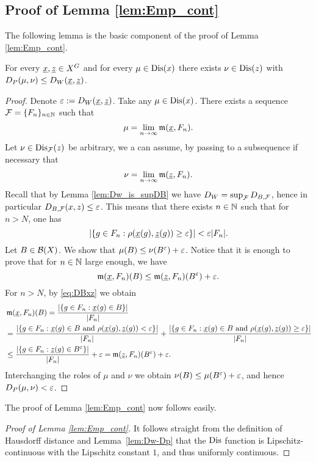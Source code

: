 \subsection*{Proof of Lemma \ref{lem:Emp_cont}} 

The following lemma is the basic component of the proof of Lemma \ref{lem:Emp_cont}.

\begin{lem}\label{lem:Dw-Dp}
For every $\underline{x},\underline{z}\in X^G$ and for every $\mu \in \operatorname{Dis}(x)$ there exists $\nu \in \operatorname{Dis}(z)$ with $D_P(\mu,\nu)\leq D_W(\underline{x},\underline{z})$.
\end{lem}
\begin{proof}
Denote $\varepsilon:=D_W(\underline{x}, \underline{z})$.
%
Take any $\mu \in \operatorname{Dis}(x)$. There exists a \Folner sequence $\operatorname{\mathcal{F}} = \{F_n\}_{n \in \mathbb{N}}$ such that
\[\mu=\lim_{n\to\infty}\operatorname{\mathfrak m}(\underline{x},F_{n}).\]
Let $\nu \in \operatorname{Dis}_{\operatorname{\mathcal{F}}}(z)$ be arbitrary, we a can assume, by passing to a subsequence if necessary that
\[\nu=\lim_{n\to\infty}\operatorname{\mathfrak m}(\underline{z},F_{n}).\]
Recall that by Lemma \ref{lem:Dw_is_supDB} we have $D_W=\sup_{\operatorname{\mathcal{F}}}D_{B,\operatorname{\mathcal{F}}}$, hence in particular $D_{B,\operatorname{\mathcal{F}}}(x,z)\leq \varepsilon$.
%
 This means that there exists $n\in\mathbb{N}$ such that for $n>N$, one has
\begin{equation}\label{eq:DBxz}
\left|\left\{g\in F_n:\rho(\underline{x}(g),\underline{z}(g))\geq\varepsilon\right\}\right|<\varepsilon|F_n|.
\end{equation}
Let $B\in\mathcal{B}(X)$. We show that $\mu(B)\leq \nu(B^{\varepsilon})+\varepsilon$. Notice that it is enough to prove that for $n\in\mathbb{N}$ large enough, we have
\[
\operatorname{\mathfrak m}(\underline{x},F_{n})(B)\leq \operatorname{\mathfrak m}(\underline{z},F_{n})(B^{\varepsilon})+\varepsilon.
\]
For $n>N$, by \eqref{eq:DBxz} we obtain
\begin{align*}
&\operatorname{\mathfrak m}(\underline{x},F_{n})(B) = \frac{\left|\left\{g\in F_n: \underline{x}(g)\in B \right\}\right|}{|F_n|}\\
&= \frac{\left|\left\{g\in F_n: \underline{x}(g)\in B  \mbox{ and } \rho(\underline{x}(g),\underline{z}(g))<\varepsilon\right\}\right|}{|F_n|} +\frac{\left|\left\{g\in F_n: \underline{x}(g)\in B \mbox{ and } \rho(\underline{x}(g),\underline{z}(g))\geq\varepsilon \right\} \right|}{|F_n|}\\
&\leq \frac{\left|\left\{g\in F_n: \underline{z}(g)\in B^{\varepsilon} \right\}\right|}{|F_n|} + \varepsilon = \operatorname{\mathfrak m}(\underline{z},F_{n})(B^{\varepsilon})+\varepsilon.
\end{align*}
Interchanging the roles of $\mu$ and $\nu$ we obtain $\nu(B)\leq \mu(B^{\varepsilon})+\varepsilon$, and hence $D_P(\mu,\nu)<\varepsilon$.
\end{proof}

\noindent
The proof of Lemma \ref{lem:Emp_cont} now follows easily.

\begin{proof}[Proof of Lemma \ref{lem:Emp_cont}]
It follows straight from the definition of Hausdorff distance and Lemma~\ref{lem:Dw-Dp} that the $\operatorname{Dis}$ function is Lipschitz-continuous with the Lipschitz constant $1$, and thus uniformly continuous.
\end{proof}

